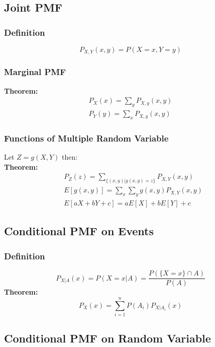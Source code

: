 \documentclass[11pt]{article}
\begin{document}
\subsection{Joint PMF}
\subsubsection{Definition}
$$P_{X,Y}(x,y) = P(X=x, Y=y)$$

\subsubsection{Marginal PMF}
\textbf{Theorem:}\\
\begin{equation*}
    \begin{split}
        P_X(x) = \sum_y P_{X,y}(x,y)\\
        P_Y(y) = \sum_x P_{X,y}(x,y)
    \end{split}
\end{equation*}

\subsubsection{Functions of Multiple Random Variable}
\indent Let $Z = g(X,Y)$ then:\\
\noindent \textbf{Theorem:}\\
\begin{equation*}
    \begin{split}
        & P_Z(z) = \sum_{\{(x,y)|g(x,y)=z\}}P_{X,Y}(x,y)\\
        & E[g(x,y)] = \sum_{x} \sum_{y} g(x,y)P_{X,Y}(x,y)\\
        & E[aX+bY+c] = aE[X] + bE[Y] + c
    \end{split}
\end{equation*}

\subsection{Conditional PMF on Events}
\subsubsection{Definition}
$$P_{X|A}(x) = P(X=x|A) = \frac{P(\{X=x\} \cap A)}{P(A)}$$
\noindent \textbf{Theorem:}\\
$$P_X(x) = \sum_{i=1}^{n}P(A_i)P_{X|A_i}(x)$$

\subsection{Conditional PMF on Random Variable}
\end{document}
